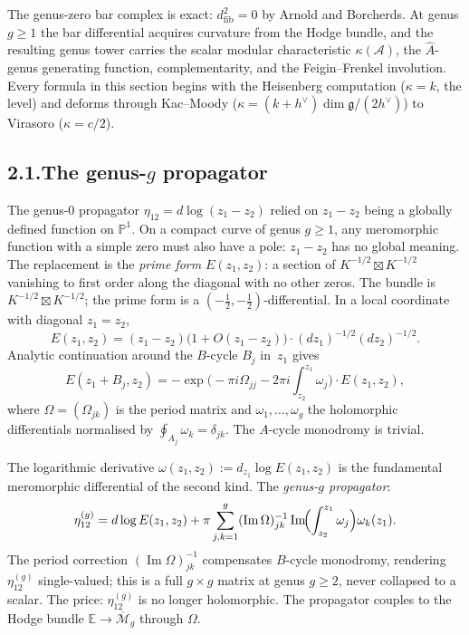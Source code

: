 \documentclass[11pt,reqno]{amsart}
\theoremstyle{definition}
\theoremstyle{remark}
\providecommand{\cA}{\mathcal{A}}
\providecommand{\fg}{\mathfrak{g}}
\providecommand{\bP}{\mathbb{P}}
\numberwithin{equation}{section}
\begin{document}
The genus-zero bar complex is exact: $d_{\mathrm{fib}}^2=0$ by Arnold
and Borcherds. At genus $g\ge 1$ the bar differential acquires
curvature from the Hodge bundle, and the resulting genus tower carries
the scalar modular characteristic $\kappa(\cA)$, the $\hat A$-genus
generating function, complementarity, and the Feigin--Frenkel
involution. Every formula in this section begins with the Heisenberg
computation ($\kappa=k$, the level) and deforms through Kac--Moody
($\kappa=(k+h^\vee)\dim\fg/(2h^\vee)$) to Virasoro ($\kappa=c/2$).

\subsection*{2.1.\enspace The genus-$g$ propagator}

The genus-$0$ propagator $\eta_{12}=d\log(z_1-z_2)$ relied on
$z_1-z_2$ being a globally defined function on $\bP^1$. On a compact
curve of genus $g\ge 1$, any meromorphic function with a simple zero
must also have a pole: $z_1-z_2$ has no global meaning. The
replacement is the \emph{prime form}
$E(z_1,z_2)$: a section of $K^{-1/2}\boxtimes K^{-1/2}$
vanishing to first order along the diagonal with no other zeros. The
bundle is $K^{-1/2}\boxtimes K^{-1/2}$; the prime form is a
$(-\tfrac12,-\tfrac12)$-differential. In a local coordinate with
diagonal $z_1=z_2$,
\[
E(z_1,z_2)=(z_1-z_2)\bigl(1+O(z_1-z_2)\bigr)\cdot(dz_1)^{-1/2}(dz_2)^{-1/2}.
\]
Analytic continuation around the $B$-cycle $B_j$ in~$z_1$ gives
\[
E(z_1+B_j,z_2)=-\exp\bigl(-\pi i\Omega_{jj}-2\pi i\textstyle\int_{z_2}^{z_1}\omega_j\bigr)\cdot E(z_1,z_2),
\]
where $\Omega=(\Omega_{jk})$ is the period matrix and
$\omega_1,\ldots,\omega_g$ the holomorphic differentials normalised by
$\oint_{A_j}\omega_k=\delta_{jk}$. The $A$-cycle monodromy is trivial.

The logarithmic derivative
$\omega(z_1,z_2):=d_{z_1}\log E(z_1,z_2)$ is the fundamental
meromorphic differential of the second kind. The \emph{genus-$g$
propagator}:
\[
\eta^{(g)}_{12}=d\log E(z_1,z_2)+\pi\sum_{j,k=1}^g(\operatorname{Im}\Omega)^{-1}_{jk}\operatorname{Im}\!\Bigl(\int_{z_2}^{z_1}\omega_j\Bigr)\omega_k(z_1).
\]
The period correction $(\operatorname{Im}\Omega)^{-1}_{jk}$ compensates
$B$-cycle monodromy, rendering $\eta^{(g)}_{12}$ single-valued; this
is a full $g\times g$ matrix at genus $g\ge 2$, never collapsed to a
scalar. The price:
$\eta^{(g)}_{12}$ is no longer holomorphic. The propagator couples to
the Hodge bundle $\mathbb E\to\overline{\mathcal M}_g$ through
$\Omega$.
\end{document}
